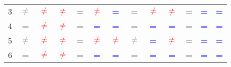 \begin{table}
\begin{center}
\begin{tabular}{ccccccccccccc}
\multicolumn{1}{c}{3}                                    & \textcolor{gray}{\textbf{$\neq$}}               & \textcolor{red}{\textbf{$\neq$}}             & \textcolor{red}{\textbf{$\neq$}}                & \textcolor{gray}{\textbf{=}}                        & \textcolor{red}{\textbf{$\neq$}}             & \textcolor{blue}{\textbf{=}}                               & \textcolor{gray}{\textbf{=}}                               & \textcolor{red}{\textbf{$\neq$}} & \textcolor{red}{\textbf{$\neq$}} & \textcolor{gray}{\textbf{=}}          & \textcolor{blue}{\textbf{=}}         & \textcolor{blue}{\textbf{=}}  \\ 
\multicolumn{1}{c}{4}                                    & \textcolor{gray}{\textbf{=}}                        &\textcolor{red}{\textbf{$\neq$}}              & \textcolor{red}{\textbf{$\neq$}}                   & \textcolor{gray}{\textbf{=}}                        & \textcolor{blue}{\textbf{=}}                         & \textcolor{blue}{\textbf{=}}                               & \textcolor{gray}{\textbf{=}}                                & \textcolor{blue}{\textbf{=}}          & \textcolor{blue}{\textbf{=}}           & \textcolor{gray}{\textbf{=}}          & \textcolor{blue}{\textbf{=}}        & \textcolor{blue}{\textbf{=}} \\ 
\multicolumn{1}{c}{5}                                    & \textcolor{gray}{\textbf{$\neq$}}               & \textcolor{red}{\textbf{$\neq$}}             & \textcolor{red}{\textbf{$\neq$}}                & \textcolor{gray}{\textbf{=}}                        & \textcolor{red}{\textbf{$\neq$}}             & \textcolor{red}{\textbf{$\neq$}}                   & \textcolor{gray}{\textbf{$\neq$}}                       & \textcolor{blue}{\textbf{=}}           & \textcolor{red}{\textbf{$\neq$}} & \textcolor{gray}{\textbf{=}}          & \textcolor{blue}{\textbf{=}}         & \textcolor{blue}{\textbf{=}}  \\ 
\multicolumn{1}{c}{6}                                    & \textcolor{gray}{\textbf{=}}                        & \textcolor{red}{\textbf{$\neq$}}            & \textcolor{red}{\textbf{$\neq$}}                   & \textcolor{gray}{\textbf{=}}                        & \textcolor{blue}{\textbf{=}}                         & \textcolor{blue}{\textbf{=}}                               & \textcolor{gray}{\textbf{=}}                                & \textcolor{blue}{\textbf{=}}           & \textcolor{blue}{\textbf{=}}          & \textcolor{gray}{\textbf{=}}          & \textcolor{blue}{\textbf{=}}         & \textcolor{blue}{\textbf{=}} \\  
\bottomrule
\end{tabular}
\end{center}
\end{table}